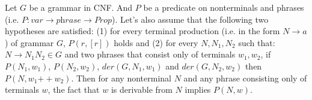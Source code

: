 %

\begin{lemma}
	Let $G$ be a grammar in CNF. And $P$ be a predicate on nonterminals and phrases (i.e. $P: var \to \textit{phrase} \to \textit{Prop}$).
	Let's also assume that the following two hypotheses are satisfied:
	(1) for every terminal production (i.e. in the form $N \to a$) of grammar $G$, $P(r, [r])$ holds and (2) for every $N, N_1, N_2$ such that: $N \to N_1 N_2 \in G$ and two phrases that consist only of terminals $w_1, w_2$, if $P(N_1, w_1)$, $P(N_2, w_2)$, $der(G, N_1, w_1)$ and $der(G, N_2, w_2)$ then $P(N, w_1 \mathbin{++} w_2)$.
	Then for any nonterminal $N$ and any phrase consisting only of terminals $w$, the fact that $w$ is derivable from $N$ implies $P(N,w)$.
\end{lemma}

%
%


